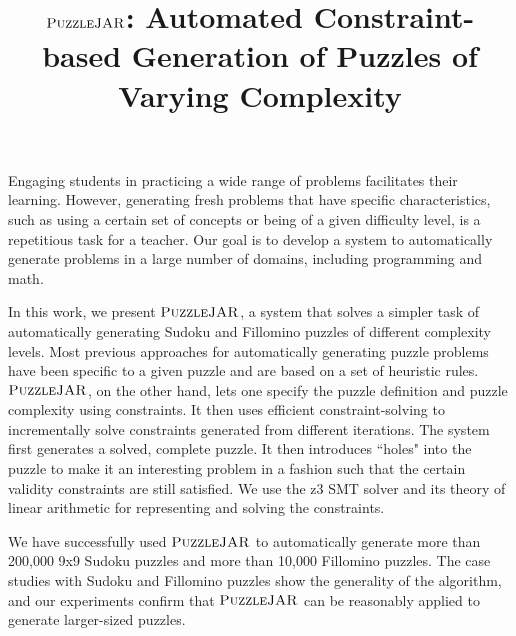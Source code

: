 \documentclass[12pt]{article}
\date{}
\begin{document}
\doublespacing


\title{$\textsc{PuzzleJAR}$: Automated Constraint-based Generation of Puzzles of Varying Complexity}

\maketitle

Engaging students in practicing a wide range of problems facilitates their learning. However, generating fresh problems that have specific characteristics, such as using a certain set of concepts or being of a given difficulty level, is a repetitious task for a teacher. Our goal is to develop a system to automatically generate problems in a large number of domains, including programming and math. 

In this work, we present $\textsc{PuzzleJAR}$, a system that solves a simpler task of automatically generating
Sudoku and Fillomino puzzles of different complexity levels. Most previous
approaches for automatically generating puzzle problems have been
specific to a given puzzle and are based on a set of heuristic
rules. $\textsc{PuzzleJAR}$, on the other hand, lets one specify the puzzle
definition and puzzle complexity using constraints. It then uses efficient constraint-solving to
incrementally solve constraints generated from different
iterations. The system first generates a solved, complete puzzle. It then introduces ``holes" into the puzzle to make it an interesting problem in a fashion such that the certain validity constraints are still satisfied. We use the z3 SMT solver  and its theory of linear arithmetic for representing
and solving the constraints.

We have successfully used $\textsc{PuzzleJAR}$ to automatically generate more
than 200,000 9x9 Sudoku puzzles and more than 10,000 Fillomino
puzzles. The case studies with Sudoku and Fillomino puzzles show the generality of the algorithm, and our experiments confirm that $\textsc{PuzzleJAR}$ can be reasonably applied to generate larger-sized puzzles.
\end{document}
